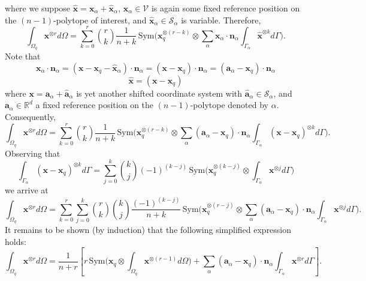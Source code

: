 \documentclass[11pt]{article} %
\begin{document}
where we suppose $\hat{\mathbf{x}} = \mathbf{x}_{\alpha} + \hat{\mathbf{x}}_{\alpha}$, $\mathbf{x}_{\alpha} \in \mathcal{V}$ is again some fixed reference position on the $(n-1)$-polytope of interest, and $\hat{\mathbf{x}}_{\alpha} \in \mathcal{S}_{\alpha}$ is variable. Therefore,
\begin{equation}
	\int_{\Omega_q} \mathbf{x}^{\otimes r} d \Omega = \sum_{k = 0}^r \binom{r}{k} \frac{1}{n+k} \, \mbox{Sym} \bigg( \mathbf{x}_q^{\otimes (r-k)} \otimes \sum_{\alpha} \mathbf{x}_{\alpha} \cdot \mathbf{n}_{\alpha} \int_{\Gamma_{\alpha}} \hat{\mathbf{x}}^{\otimes k}   d \Gamma \bigg) .
\end{equation}
Note that
\begin{equation}
	\mathbf{x}_{\alpha} \cdot \mathbf{n}_{\alpha} = (\mathbf{x} - \mathbf{x}_q - \hat{\mathbf{x}}_{\alpha}) \cdot \mathbf{n}_{\alpha} = (\mathbf{x} - \mathbf{x}_q) \cdot \mathbf{n}_{\alpha} =  (\mathbf{a}_{\alpha} - \mathbf{x}_q) \cdot \mathbf{n}_{\alpha}
\end{equation}
\begin{equation}
	\hat{\mathbf{x}} = (\mathbf{x} - \mathbf{x}_q)
\end{equation}
where $\mathbf{x} = \mathbf{a}_{\alpha} + \hat{\mathbf{a}}_{\alpha}$ is yet another shifted coordinate system with $\hat{\mathbf{a}}_{\alpha} \in \mathcal{S}_{\alpha}$, and $\mathbf{a}_{\alpha} \in \mathbb{R}^d$ a fixed reference position on the $(n-1)$-polytope denoted by $\alpha$. Consequently,
\begin{equation}
	\int_{\Omega_q} \mathbf{x}^{\otimes r} d \Omega = \sum_{k = 0}^r \binom{r}{k} \frac{1}{n+k} \, \mbox{Sym} \bigg( \mathbf{x}_q^{\otimes (r-k)} \otimes \sum_{\alpha} (\mathbf{a}_{\alpha} - \mathbf{x}_q) \cdot \mathbf{n}_{\alpha} \int_{\Gamma_{\alpha}} (\mathbf{x} - \mathbf{x}_q)^{\otimes k} d \Gamma \bigg) .
\end{equation}
Observing that
\begin{equation}
	\int_{\Gamma_{\alpha}} (\mathbf{x} - \mathbf{x}_q)^{\otimes k} d \Gamma = \sum_{j = 0}^k \binom{k}{j} (-1)^{(k-j)} \, \mbox{Sym} \bigg( \mathbf{x}_q^{\otimes (k-j)} \otimes \int_{\Gamma_{\alpha}} \mathbf{x}^{\otimes j} d \Gamma \bigg)
\end{equation}
we arrive at
\begin{equation}
	\int_{\Omega_q} \mathbf{x}^{\otimes r} d \Omega = \sum_{k = 0}^r \sum_{j = 0}^k \binom{r}{k} \binom{k}{j} \frac{(-1)^{(k-j)}}{n+k} \, \mbox{Sym} \bigg( \mathbf{x}_q^{\otimes (r-j)} \otimes \sum_{\alpha} (\mathbf{a}_{\alpha} - \mathbf{x}_q) \cdot \mathbf{n}_{\alpha} \int_{\Gamma_{\alpha}} \mathbf{x}^{\otimes j} d \Gamma \bigg) .
\end{equation}
It remains to be shown (by induction) that the following simplified expression holds:
\begin{equation}
	\int_{\Omega_q} \mathbf{x}^{\otimes r} d \Omega = \frac{1}{n+r} \left[ r \, \mbox{Sym} \bigg( \mathbf{x}_q \otimes \int_{\Omega_q} \mathbf{x}^{\otimes (r-1)} d \Omega \bigg) + \sum_{\alpha} (\mathbf{a}_{\alpha} - \mathbf{x}_q) \cdot \mathbf{n}_{\alpha} \int_{\Gamma_{\alpha}} \mathbf{x}^{\otimes r} d \Gamma \right] .
\end{equation}
\end{document}
